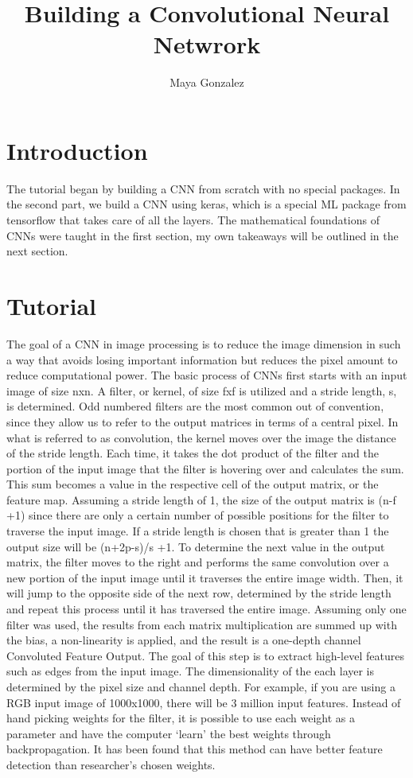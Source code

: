 \documentclass[10pt,twocolumn]{article}
\title{Building a Convolutional Neural Netwrork}
\author{Maya Gonzalez}
\affiliation{Occidental College}
\begin{document}
\maketitle

\section{Introduction}
The tutorial began by building a CNN from scratch with no special packages. In the second part, we build a CNN using keras, which is a special ML package from tensorflow that takes care of all the layers. 
The mathematical foundations of CNNs were taught in the first section, my own takeaways will be outlined in the next section. 

\section{Tutorial}
The goal of a CNN in image processing is to reduce the image dimension in such a way that avoids losing important information but reduces the pixel amount to reduce computational power. The basic process of CNNs first starts with an input image of size nxn. A filter, or kernel, of size fxf is utilized and a stride length, s, is determined. Odd numbered filters are the most common out of convention, since they allow us to refer to the output matrices in terms of a central pixel. In what is referred to as convolution, the kernel moves over the image the distance of the stride length. Each time, it takes the dot product of  the filter and the portion of the input image that the filter is hovering over and calculates the sum. This sum becomes a value in the respective cell of the output matrix, or the feature map. Assuming a stride length of 1, the size of the output matrix is (n-f +1) since there are only a certain number of possible positions for the filter to traverse the input image. If a stride length is chosen that is greater than 1 the output size will be (n+2p-s)/s +1. To determine the next value in the output matrix, the filter moves to the right and performs the same convolution over a new portion of the input image until it traverses the entire image width. Then, it will jump to the opposite side of the next row, determined by the stride length and repeat this process until it has traversed the entire image. Assuming only one filter was used, the results from each matrix multiplication are summed up with the bias, a non-linearity is applied, and the result is a one-depth channel Convoluted Feature Output. The goal of this step is to extract high-level features such as edges from the input image. The dimensionality of the each layer is determined by the pixel size and channel depth. For example, if you are using a RGB input image of 1000x1000, there will be 3 million input features. Instead of hand picking weights for the filter, it is possible to use each weight as a parameter and have the computer ‘learn’ the best weights through backpropagation. It has been found that this method can have better feature detection than researcher’s chosen weights. 
\end{document}
